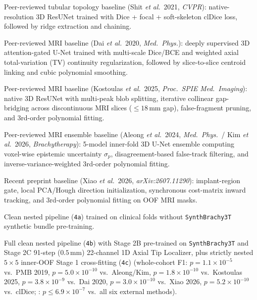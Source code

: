 \begin{table}[tbp]
\begin{threeparttable}
\begin{tablenotes}[flushleft]
\item[b] Peer-reviewed tubular topology baseline (Shit \emph{et al.}\ 2021, \emph{CVPR}): native-resolution 3D ResUNet trained with Dice + focal + soft-skeleton clDice loss, followed by ridge extraction and chaining.
\item[c] Peer-reviewed MRI baseline (Dai \emph{et al.}\ 2020, \emph{Med.\ Phys.}): deeply supervised 3D attention-gated U-Net trained with multi-scale Dice/BCE and weighted axial total-variation (TV) continuity regularization, followed by slice-to-slice centroid linking and cubic polynomial smoothing.
\item[d] Peer-reviewed MRI baseline (Kostoulas \emph{et al.}\ 2025, \emph{Proc.\ SPIE Med.\ Imaging}): native 3D ResUNet with multi-peak blob splitting, iterative collinear gap-bridging across discontinuous MRI slices ($\le 18$\,mm gap), false-fragment pruning, and 3rd-order polynomial fitting.
\item[e] Peer-reviewed MRI ensemble baseline (Aleong \emph{et al.}\ 2024, \emph{Med.\ Phys.}\ / Kim \emph{et al.}\ 2026, \emph{Brachytherapy}): 5-model inner-fold 3D U-Net ensemble computing voxel-wise epistemic uncertainty $\sigma_p$, disagreement-based false-track filtering, and inverse-variance-weighted 3rd-order polynomial fitting.
\item[f] Recent preprint baseline (Xiao \emph{et al.}\ 2026, \emph{arXiv:2607.11290}): implant-region gate, local PCA/Hough direction initialization, synchronous cost-matrix inward tracking, and 3rd-order polynomial fitting on OOF MRI masks.
\item[g] Clean nested \NF{} pipeline (\texttt{4a}) trained on clinical folds without \texttt{SynthBrachy3T} synthetic bundle pre-training.
\item[h] Full clean nested \NF{} pipeline (\texttt{4b}) with Stage 2B pre-trained on \texttt{SynthBrachy3T} and Stage 2C 91-step ($0.5$\,mm) 22-channel 1D Axial Tip Localizer, plus strictly nested $5\times 5$ inner-OOF Stage 1 cross-fitting (\texttt{4c}) (whole-cohort F1: $p = 1.1\times10^{-5}$ vs.\ PMB 2019, $p = 5.0\times10^{-10}$ vs.\ Aleong/Kim, $p = 1.8\times10^{-10}$ vs.\ Kostoulas 2025, $p = 3.8\times10^{-9}$ vs.\ Dai 2020, $p = 3.0\times10^{-10}$ vs.\ Xiao 2026, $p = 5.2\times10^{-10}$ vs.\ clDice; \Etip{}: $p \le 6.9\times10^{-7}$ vs.\ all six external methods).

\end{tablenotes}
\end{threeparttable}
\end{table}
